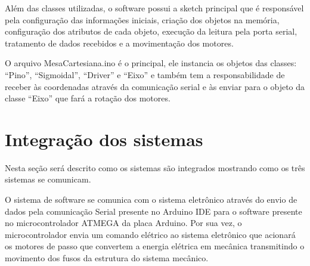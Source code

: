 Além das classes utilizadas, o software possui a sketch principal que é responsável pela configuração das 
informações iniciais, criação dos objetos na memória, configuração dos atributos de cada objeto, execução 
da leitura pela porta serial, tratamento de dados recebidos e a movimentação dos motores.

    
O arquivo MesaCartesiana.ino é o principal, ele instancia os objetos das classes: “Pino”, “Sigmoidal”, 
“Driver” e “Eixo” e também tem a responsabilidade de receber às coordenadas através da comunicação serial 
e às enviar para o objeto da classe “Eixo” que fará a rotação dos motores.

\section{Integração dos sistemas}\label{subsec:metintegracao}

Nesta seção será descrito como os sistemas são integrados mostrando como os três sistemas se comunicam. 

    
O sistema de software se comunica com o sistema eletrônico através do envio de dados pela comunicação 
Serial presente no Arduino IDE para o software presente no microcontrolador ATMEGA da placa Arduino. 
Por sua vez, o microcontrolador envia um comando elétrico ao sistema eletrônico que acionará os motores 
de passo que convertem a energia elétrica em mecânica transmitindo o movimento dos fusos da estrutura do 
sistema mecânico.